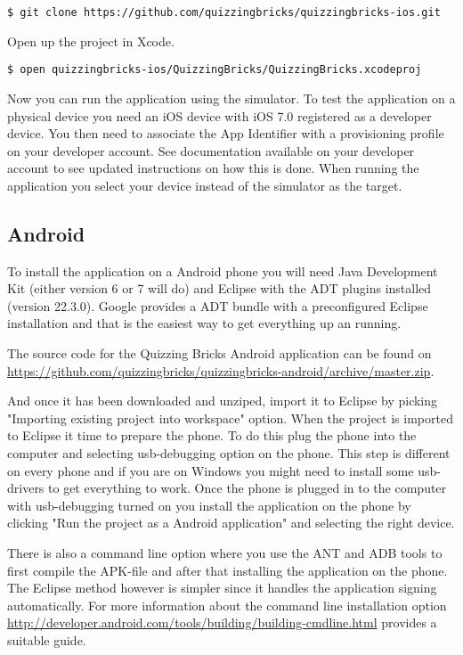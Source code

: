 \begin{verbatim}
$ git clone https://github.com/quizzingbricks/quizzingbricks-ios.git

\end{verbatim}

Open up the project in Xcode.

\begin{verbatim}
$ open quizzingbricks-ios/QuizzingBricks/QuizzingBricks.xcodeproj
\end{verbatim}

Now you can run the application using the simulator. To test the application on a physical device you need an iOS device with iOS 7.0 registered as a developer device. You then need to associate the App Identifier with a provisioning profile on your developer account. See documentation available on your developer account to see updated instructions on how this is done. When running the application you select your device instead of the simulator as the target.

\subsection{Android}
To install the application on a Android phone you will need Java Development Kit (either version 6 or 7 will do) and Eclipse with the ADT plugins installed (version 22.3.0). Google provides a ADT bundle with a preconfigured Eclipse installation and that is the easiest way to get everything up an running. 

The source code for the Quizzing Bricks Android application can be found on \url{https://github.com/quizzingbricks/quizzingbricks-android/archive/master.zip}.

And once it has been downloaded and unziped, import it to Eclipse by picking "Importing existing project into workspace" option. When the project is imported to Eclipse it time to prepare the phone. To do this plug the phone into the computer and selecting usb-debugging option on the phone. This step is different on every phone and if you are on Windows you might need to install some usb-drivers to get everything to work. Once the phone is plugged in to the computer with usb-debugging turned on you install the application on the phone by clicking "Run the project as a Android application" and selecting the right device.

There is also a command line option where you use the ANT and ADB tools to first compile the APK-file and after that installing the application on the phone. The Eclipse method however is simpler since it handles the application signing automatically. For more information about the command line installation option \url{http://developer.android.com/tools/building/building-cmdline.html} provides a suitable guide.